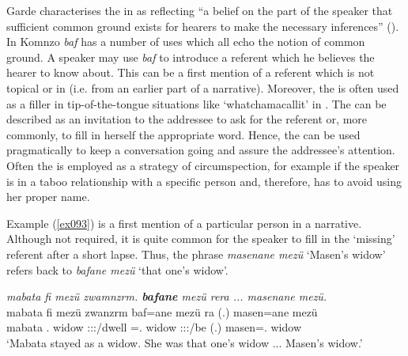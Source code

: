 Garde characterises the   in  as reflecting ``a belief on the part of the speaker that sufficient common ground exists for hearers to make the necessary inferences'' (\citeyear[250]{Garde:2013ut}). In Komnzo \textit{baf} has a number of uses which all echo the notion of common ground. A speaker may use \emph{baf} to introduce a referent which he believes the hearer to know about. This can be a first mention of a referent which is not topical or in  (i.e. from an earlier part of a narrative). Moreover, the  is often used as a filler in tip-of-the-tongue situations like `whatchamacallit' in . The  can be described as an invitation to the addressee to ask for the referent or, more commonly, to fill in herself the appropriate word. Hence, the  can be used pragmatically to keep a conversation going and assure the addressee's attention. Often the  is employed as a strategy of circumspection, for example if the speaker is in a taboo relationship with a specific person and, therefore, has to avoid using her proper name.

Example (\ref{ex093}) is a first mention of a particular person in a narrative. Although not required, it is quite common for the speaker to fill in the `missing' referent after a short lapse. Thus, the phrase \emph{masenane mezü} `Masen's widow' refers back to \emph{bafane mezü} `that one's widow'.

\begin{exe}
	\ex \emph{mabata fi mezü zwamnzrm. \textbf{bafane} mezü rera ... masenane mezü.}\\
	\gll mabata fi mezü zwanzrm baf=ane mezü ra (.) masen=ane mezü\\
	mabata \Third.{\Abs} widow \Tsg\F{}:\Sbj:\Pst:\Dur{}/dwell {\Recog}=\Poss.{\Sg} widow \Tsg\F{}:\Sbj:\Pst:\Ipfv/be (.) masen=\Poss.{\Sg} widow\\
	\trans `Mabata stayed as a widow. She was that one's widow ... Masen's widow.' 
	\label{ex093}
\end{exe}

